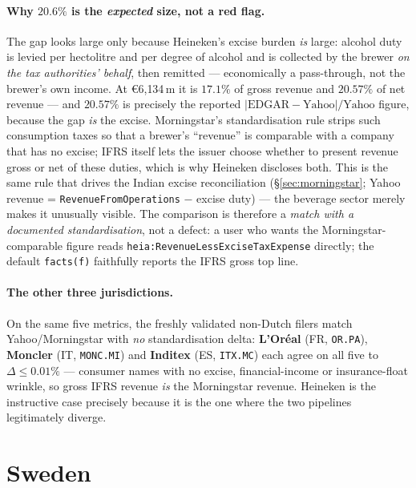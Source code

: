 \documentclass[11pt,a4paper]{report}
\begin{document}
\paragraph{Why $20.6\%$ is the \emph{expected} size, not a red flag.} The gap looks large only because Heineken's
excise burden \emph{is} large: alcohol duty is levied per hectolitre and per degree of alcohol and is collected
by the brewer \emph{on the tax authorities' behalf}, then remitted --- economically a pass-through, not the
brewer's own income. At €6{,}134\,m it is $17.1\%$ of gross revenue and $20.57\%$ of net revenue --- and
$20.57\%$ is precisely the reported \(\lvert\text{EDGAR}-\text{Yahoo}\rvert/\text{Yahoo}\) figure, because the
gap \emph{is} the excise. Morningstar's standardisation rule strips such consumption taxes so that a brewer's
``revenue'' is comparable with a company that has no excise; IFRS itself lets the issuer choose whether to
present revenue gross or net of these duties, which is why Heineken discloses both. This is the same rule that
drives the Indian excise reconciliation (\S\ref{sec:morningstar}; Yahoo revenue = \texttt{RevenueFromOperations}
$-$ excise duty) --- the beverage sector merely makes it unusually visible. The comparison is therefore a
\emph{match with a documented standardisation}, not a defect: a user who wants the Morningstar-comparable figure
reads \texttt{heia:RevenueLessExciseTaxExpense} directly; the default \texttt{facts(f)} faithfully reports the
IFRS gross top line.

\paragraph{The other three jurisdictions.} On the same five metrics, the freshly validated non-Dutch filers
match Yahoo/Morningstar with \emph{no} standardisation delta: \textbf{L'Or\'eal} (FR, \texttt{OR.PA}),
\textbf{Moncler} (IT, \texttt{MONC.MI}) and \textbf{Inditex} (ES, \texttt{ITX.MC}) each agree on all five to
$\Delta\le 0.01\%$ --- consumer names with no excise, financial-income or insurance-float wrinkle, so gross
IFRS revenue \emph{is} the Morningstar revenue. Heineken is the instructive case precisely because it is the
one where the two pipelines legitimately diverge.

\section{Sweden}
\label{sec:esef-sweden}
\end{document}
